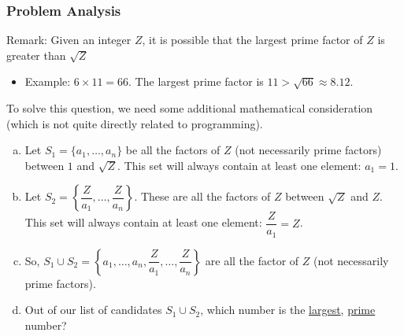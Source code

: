 \documentclass[12pt]{article}
\begin{document}
\subsubsection*{Problem Analysis}
Remark: Given an integer $Z$, it is possible that the largest prime factor of $Z$ is greater than $\sqrt{Z}$
\begin{itemize}

\item Example: $6 \times 11 = 66$. The largest prime factor is $11 > \sqrt{66} \approx 8.12$.
\end{itemize}
To solve this question, we need some additional mathematical consideration (which is not quite directly related to programming).
\begin{enumerate}[(a)]
\item Let $S_1 = \{a_1, \ldots, a_n\}$ be all the factors of $Z$ (not necessarily prime factors) between $1$ and $\sqrt{Z}$. This set will always contain at least one element: $a_1 = 1$.
\item Let $S_2 = \left\{\dfrac{Z}{a_1},\ldots, \dfrac{Z}{a_n}\right\}$. These are all the factors of $Z$ between $\sqrt{Z}$ and $Z$. This set will always contain at least one element: $\dfrac{Z}{a_1} = Z$.
\item So, $S_1 \cup S_2 =  \left\{a_1, \ldots, a_n, \dfrac{Z}{a_1},\ldots, \dfrac{Z}{a_n}\right\}$ are all the factor of $Z$ (not necessarily prime factors).
\item Out of our list of candidates $S_1 \cup S_2$, which number is the \underline{largest}, \underline{prime} number?
\end{enumerate}
\end{document}
